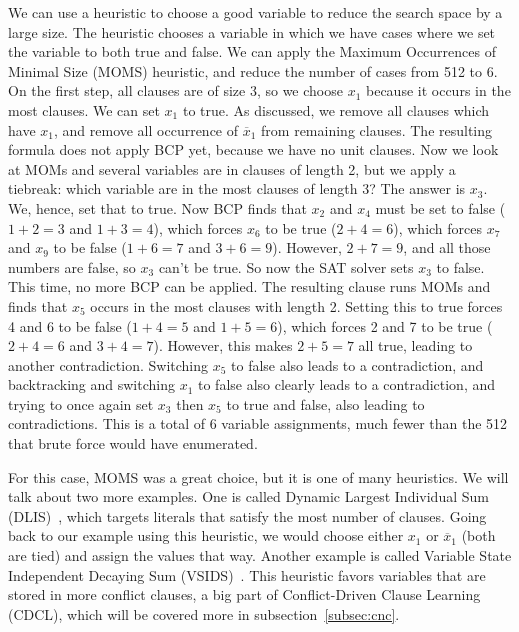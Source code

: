 We can use a heuristic to choose a good variable to reduce the search space by a large size. The  heuristic chooses a variable in which we have cases where we set the variable to both true and false. We can apply the Maximum Occurrences of Minimal Size (MOMS) heuristic, and reduce the number of cases from 512 to 6. On the first step, all clauses are of size 3, so we choose $x_1$ because it occurs in the most clauses. We can set $x_1$ to true. As discussed, we remove all clauses which have $x_1$, and remove all occurrence of $\overline{x}_1$ from remaining clauses. The resulting formula does not apply BCP yet, because we have no unit clauses. Now we look at MOMs and several variables are in clauses of length 2, but we apply a tiebreak: which variable are in the most clauses of length 3? The answer is $x_3$. We, hence, set that to true. Now BCP finds that $x_2$ and $x_4$ must be set to false ($1+2 = 3$ and $1+3 = 4$), which forces $x_6$ to be true ($2+4=6$), which forces $x_7$ and $x_9$ to be false ($1+6 = 7$ and $3+6 = 9$). However, $2+7=9$, and all those numbers are false, so $x_3$ can't be true. So now the SAT solver sets $x_3$ to false. This time, no more BCP can be applied. The resulting clause runs MOMs and finds that $x_5$ occurs in the most clauses with length 2. Setting this to true forces 4 and 6 to be false ($1+4 = 5$ and $1+5 = 6$), which forces 2 and 7 to be true ($2+4=6$ and $3+4=7$). However, this makes $2+5 = 7$ all true, leading to another contradiction. Switching $x_5$ to false also leads to a contradiction, and backtracking and switching $x_1$ to false also clearly leads to a contradiction, and trying to once again set $x_3$ then $x_5$ to true and false, also leading to contradictions. This is a total of 6 variable assignments, much fewer than the 512 that brute force would have enumerated. \par
For this case, MOMS was a great choice, but it is one of many heuristics. We will talk about two more examples. One is called Dynamic Largest Individual Sum (DLIS)~\cite{Silva:1999:IBH:645377.651196}, which targets literals that satisfy the most number of clauses. Going back to our example using this heuristic, we would choose either $x_1$ or $\overline{x}_1$ (both are tied) and assign the values that way. Another example is called Variable State Independent Decaying Sum (VSIDS)~\cite{Moskewicz:2001}. This heuristic favors variables that are stored in more conflict clauses, a big part of Conflict-Driven Clause Learning (CDCL), which will be covered more in subsection~\ref{subsec:cnc}. \par
